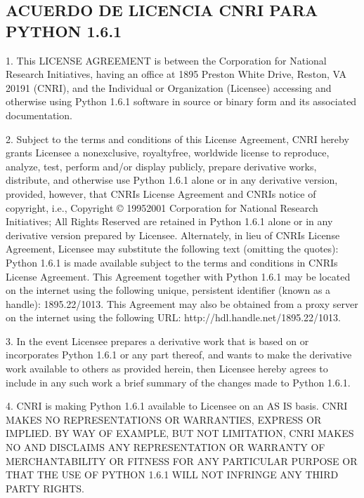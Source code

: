 \documentclass[a4,10pt,spanish]{sphinxmanual}
\begin{document}
\subsection{ACUERDO DE LICENCIA CNRI PARA PYTHON 1.6.1}
\label{\detokenize{license:cnri-license-agreement-for-python-1-6-1}}
\begin{sphinxVerbatim}[commandchars=\\\{\}]
1. This LICENSE AGREEMENT is between the Corporation for National Research
   Initiatives, having an office at 1895 Preston White Drive, Reston, VA 20191
   (\PYGZdq{}CNRI\PYGZdq{}), and the Individual or Organization (\PYGZdq{}Licensee\PYGZdq{}) accessing and
   otherwise using Python 1.6.1 software in source or binary form and its
   associated documentation.

2. Subject to the terms and conditions of this License Agreement, CNRI hereby
   grants Licensee a nonexclusive, royalty\PYGZhy{}free, world\PYGZhy{}wide license to reproduce,
   analyze, test, perform and/or display publicly, prepare derivative works,
   distribute, and otherwise use Python 1.6.1 alone or in any derivative version,
   provided, however, that CNRI\PYGZsq{}s License Agreement and CNRI\PYGZsq{}s notice of copyright,
   i.e., \PYGZdq{}Copyright © 1995\PYGZhy{}2001 Corporation for National Research Initiatives; All
   Rights Reserved\PYGZdq{} are retained in Python 1.6.1 alone or in any derivative version
   prepared by Licensee.  Alternately, in lieu of CNRI\PYGZsq{}s License Agreement,
   Licensee may substitute the following text (omitting the quotes): \PYGZdq{}Python 1.6.1
   is made available subject to the terms and conditions in CNRI\PYGZsq{}s License
   Agreement.  This Agreement together with Python 1.6.1 may be located on the
   internet using the following unique, persistent identifier (known as a handle):
   1895.22/1013.  This Agreement may also be obtained from a proxy server on the
   internet using the following URL: http://hdl.handle.net/1895.22/1013.\PYGZdq{}

3. In the event Licensee prepares a derivative work that is based on or
   incorporates Python 1.6.1 or any part thereof, and wants to make the derivative
   work available to others as provided herein, then Licensee hereby agrees to
   include in any such work a brief summary of the changes made to Python 1.6.1.

4. CNRI is making Python 1.6.1 available to Licensee on an \PYGZdq{}AS IS\PYGZdq{} basis.  CNRI
   MAKES NO REPRESENTATIONS OR WARRANTIES, EXPRESS OR IMPLIED.  BY WAY OF EXAMPLE,
   BUT NOT LIMITATION, CNRI MAKES NO AND DISCLAIMS ANY REPRESENTATION OR WARRANTY
   OF MERCHANTABILITY OR FITNESS FOR ANY PARTICULAR PURPOSE OR THAT THE USE OF
   PYTHON 1.6.1 WILL NOT INFRINGE ANY THIRD PARTY RIGHTS.


\end{sphinxVerbatim}
\end{document}
